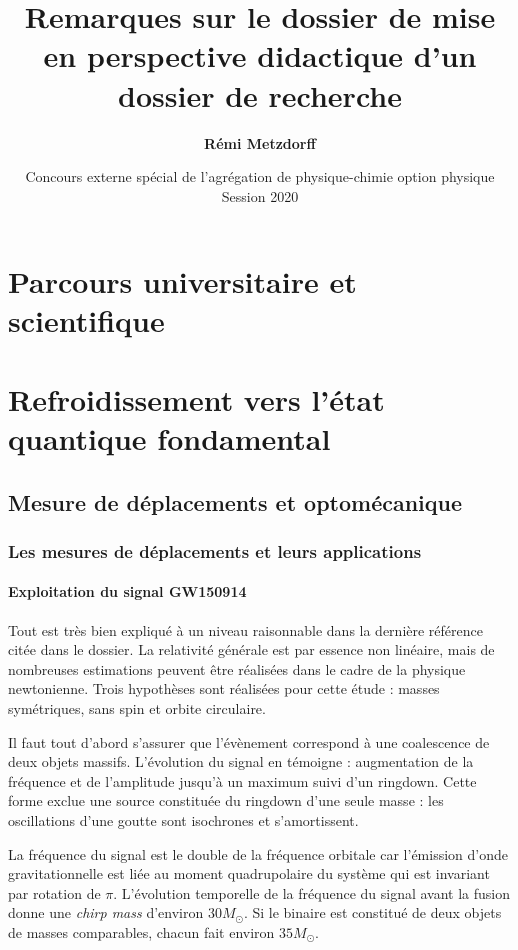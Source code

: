 \documentclass[12pt,a4paper]{article}
\title{Remarques sur le dossier de mise en perspective didactique d'un dossier de recherche}
\author{\textbf{Rémi Metzdorff}}
\date{Concours externe spécial de l'agrégation de physique-chimie option physique Session 2020}
\begin{document}
\maketitle

\section{Parcours universitaire et scientifique}

\section{Refroidissement vers l'état quantique fondamental}

\subsection{Mesure de déplacements et optomécanique}
\label{sec:intro}

\subsubsection{Les mesures de déplacements et leurs applications}

\paragraph{Exploitation du signal GW150914\\}
Tout est très bien expliqué à un niveau raisonnable dans la dernière référence citée dans le dossier.
La relativité générale est par essence non linéaire, mais de nombreuses estimations peuvent être réalisées dans le cadre de la physique newtonienne.
Trois hypothèses sont réalisées pour cette étude : masses symétriques, sans spin et orbite circulaire.

Il faut tout d'abord s'assurer que l'évènement correspond à une coalescence de deux objets massifs.
L'évolution du signal en témoigne : augmentation de la fréquence et de l'amplitude jusqu'à un maximum suivi d'un ringdown.
Cette forme exclue une source constituée du ringdown d'une seule masse : les oscillations d'une goutte sont isochrones et s'amortissent.

La fréquence du signal est le double de la fréquence orbitale car l'émission d'onde gravitationnelle est liée au moment quadrupolaire du système qui est invariant par rotation de $\pi$.
L'évolution temporelle de la fréquence du signal avant la fusion donne une \emph{chirp mass} d'environ $\unit{30}{M_\odot}$.
Si le binaire est constitué de deux objets de masses comparables, chacun fait environ $\unit{35}{M_\odot}$.
\end{document}
